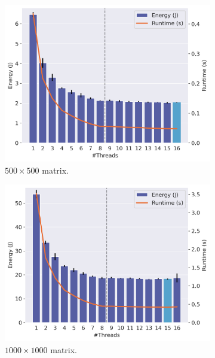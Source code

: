 \begin{figure}[!ht]
    \centering
    \begin{subfigure}{0.33\linewidth}
        \includegraphics[width=\linewidth]{images/rust_500.png}
        \caption{$500 \times 500$ matrix.}
        \label{fig:rust1}
    \end{subfigure}%
    \begin{subfigure}{0.33\linewidth}
        \includegraphics[width=\linewidth]{images/rust_1000.png}
        \caption{$1000 \times 1000$ matrix.}
        \label{fig:rust2}
    \end{subfigure}%
    \begin{subfigure}{0.33\linewidth}

\end{subfigure}
\end{figure}
